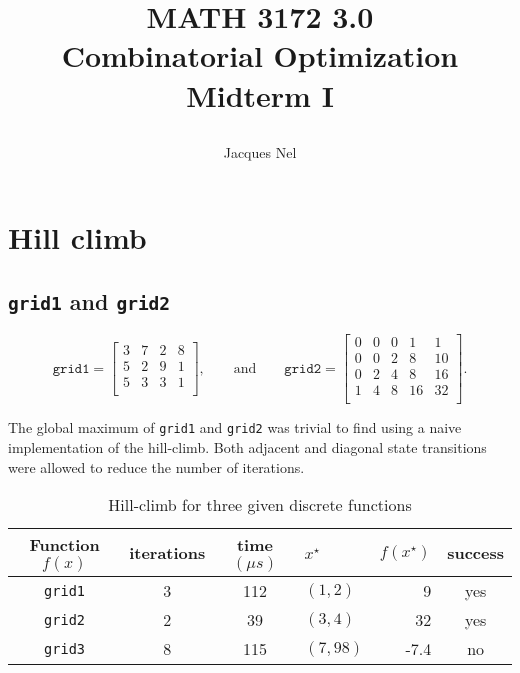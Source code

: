 \documentclass[11pt,oneside]{article}
\title{{\bf MATH 3172 3.0\\ Combinatorial Optimization}\\\vspace{10pt} \large Midterm I     
    \author{Jacques Nel}
}
\begin{document}
\maketitle

\newpage


\section{Hill climb}

\subsection{\texttt{grid1} and \texttt{grid2}}

$$
\mathtt{grid1}=
\begin{bmatrix}
    3 & 7 & 2 & 8 \\
    5 & 2 & 9 & 1 \\
    5 & 3 & 3 & 1 \\
\end{bmatrix},
\quad\quad\text{and}\quad\quad
\mathtt{grid2}=
\begin{bmatrix}
    0 & 0 & 0 & 1 & 1 \\
    0 & 0 & 2 & 8 & 10 \\
    0 & 2 & 4 & 8 & 16 \\
    1 & 4 & 8 & 16 & 32 \\
\end{bmatrix}.
$$

The global maximum of \texttt{grid1} and \texttt{grid2} was trivial to find using
a naive implementation of the hill-climb. Both adjacent and diagonal state
transitions were allowed to reduce the number of iterations.

\begin{table}[h]
    \centering
    \caption{Hill-climb for three given discrete functions}
\begin{tabular}{c|cclr|c}
    Function $f(x)$ & iterations & time $(\mu s)$ & $x^\star$ & $f(x^\star)$ & success \\
    \hline
    \texttt{grid1} & 3 & 112 & $(1,2)$ & 9 & yes \\
    \texttt{grid2} & 2 & 39 & $(3,4)$ & 32 & yes \\
    \texttt{grid3} & 8 & 115 & $(7,98)$ & -7.4 & no \\
\end{tabular}
\end{table}
\end{document}
